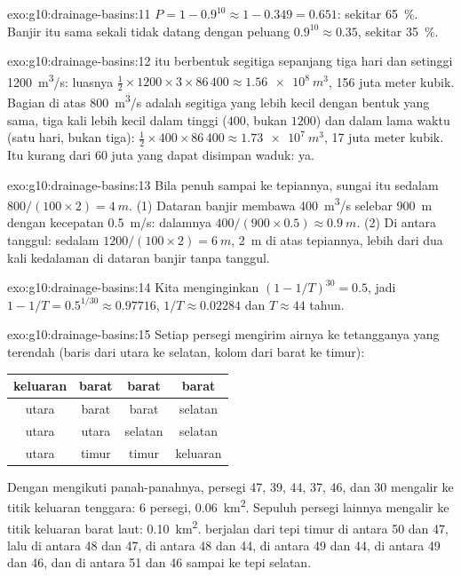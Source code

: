 \begin{solution}{exo:g10:drainage-basins:11}
$P = 1 - 0.9^{10} \approx 1 - 0.349 = 0.651$: sekitar \qty{65}{\percent}.
Banjir itu sama sekali tidak datang dengan peluang $0.9^{10} \approx 0.35$,
sekitar \qty{35}{\percent}.
\end{solution}

\begin{solution}{exo:g10:drainage-basins:12}
 itu berbentuk segitiga sepanjang tiga hari dan setinggi
\qty{1200}{m^3/s}: luasnya $\tfrac12 \times 1200 \times 3 \times 86\,400 \approx
\qty{1.56e8}{m^3}$, \num{156} juta meter kubik. Bagian di atas
\qty{800}{m^3/s} adalah segitiga yang lebih kecil dengan bentuk yang sama, tiga
kali lebih kecil dalam tinggi ($400$, bukan $1200$) dan dalam lama waktu (satu
hari, bukan tiga): $\tfrac12 \times 400 \times 86\,400 \approx \qty{1.73e7}{m^3}$,
\num{17} juta meter kubik. Itu kurang dari \num{60} juta yang dapat disimpan
waduk: ya.
\end{solution}

\begin{solution}{exo:g10:drainage-basins:13}
Bila penuh sampai ke tepiannya, sungai itu sedalam
$800/(100 \times 2) = \qty{4}{m}$. (1) Dataran banjir membawa
\qty{400}{m^3/s} selebar \qty{900}{m} dengan kecepatan \qty{0.5}{m/s}:
dalamnya $400/(900 \times 0.5) \approx \qty{0.9}{m}$. (2) Di antara tanggul:
sedalam $1200/(100 \times 2) = \qty{6}{m}$, \qty{2}{m} di atas tepiannya, lebih
dari dua kali kedalaman di dataran banjir tanpa tanggul.
\end{solution}

\begin{solution}{exo:g10:drainage-basins:14}
Kita menginginkan $(1 - 1/T)^{30} = 0.5$, jadi $1 - 1/T = 0.5^{1/30} \approx 0.97716$,
$1/T \approx 0.02284$ dan $T \approx 44$ tahun.
\end{solution}

\begin{solution}{exo:g10:drainage-basins:15}
Setiap persegi mengirim airnya ke tetangganya yang terendah (baris dari utara
ke selatan, kolom dari barat ke timur):
\begin{center}
\begin{tabular}{|c|c|c|c|}
\hline
keluaran & barat & barat & barat \\ \hline
utara & barat & barat & selatan \\ \hline
utara & utara & selatan & selatan \\ \hline
utara & timur & timur & keluaran \\ \hline
\end{tabular}
\end{center}
Dengan mengikuti panah-panahnya, persegi 47, 39, 44, 37, 46, dan 30 mengalir
ke titik keluaran tenggara: 6 persegi, \qty{0.06}{km^2}. Sepuluh persegi
lainnya mengalir ke titik keluaran barat laut: \qty{0.10}{km^2}.  berjalan dari tepi timur di antara 50 dan 47, lalu di antara 48 dan 47, di
antara 48 dan 44, di antara 49 dan 44, di antara 49 dan 46, dan di antara 51
dan 46 sampai ke tepi selatan.
\end{solution}

